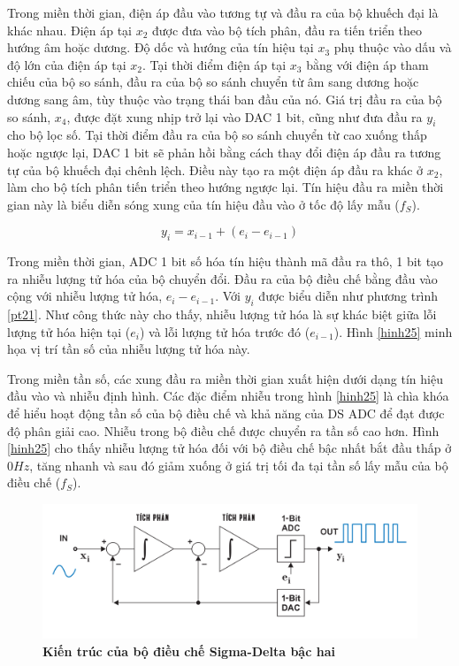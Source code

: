 Trong miền thời gian, điện áp đầu vào tương tự và đầu ra của bộ khuếch đại là khác nhau. Điện áp tại $x_2$ được đưa vào bộ tích phân, đầu ra tiến triển theo hướng âm hoặc dương. Độ dốc và hướng của tín hiệu tại $x_3$ phụ thuộc vào dấu và độ lớn của điện áp tại $x_2$. Tại thời điểm điện áp tại $x_3$ bằng với điện áp tham chiếu của bộ so sánh, đầu ra của bộ so sánh chuyển từ âm sang dương hoặc dương sang âm, tùy thuộc vào trạng thái ban đầu của nó. Giá trị đầu ra của bộ so sánh, $x_4$, được đặt xung nhịp trở lại vào DAC 1 bit, cũng như đưa đầu ra $y_i$ cho bộ lọc số. Tại thời điểm đầu ra của bộ so sánh chuyển từ cao xuống thấp hoặc ngược lại, DAC 1 bit sẽ phản hồi bằng cách thay đổi điện áp đầu ra tương tự của bộ khuếch đại chênh lệch. Điều này tạo ra một điện áp đầu ra khác ở $x_2$, làm cho bộ tích phân tiến triển theo hướng ngược lại. Tín hiệu đầu ra miền thời gian này là biểu diễn sóng xung của tín hiệu đầu vào ở tốc độ lấy mẫu ($f_S$).

\begin{equation}\label{pt21}
    y_i = x_{i - 1} + (e_i - e_{i - 1})
\end{equation}

 Trong miền thời gian, ADC 1 bit số hóa tín hiệu thành mã đầu ra thô, 1 bit tạo ra nhiễu lượng tử hóa của bộ chuyển đổi. Đầu ra của bộ điều chế bằng đầu vào cộng với nhiễu lượng tử hóa, $e_i - e_{i-1}$. Với $y_i$ được biểu diễn như phương trình \ref{pt21}. Như công thức này cho thấy, nhiễu lượng tử hóa là sự khác biệt giữa lỗi lượng tử hóa hiện tại ($e_i$) và lỗi lượng tử hóa trước đó ($e_{i - 1}$). Hình \ref{hinh25} minh họa vị trí tần số của nhiễu lượng tử hóa này.

Trong miền tần số, các xung đầu ra miền thời gian xuất hiện dưới dạng tín hiệu đầu vào và nhiễu định hình. Các đặc điểm nhiễu trong hình \ref{hinh25} là chìa khóa để hiểu hoạt động tần số của bộ điều chế và khả năng của DS ADC để đạt được độ phân giải cao. Nhiễu trong bộ điều chế được chuyển ra tần số cao hơn. Hình \ref{hinh25} cho thấy nhiễu lượng tử hóa đối với bộ điều chế bậc nhất bắt đầu thấp ở $0 Hz$, tăng nhanh và sau đó giảm xuống ở giá trị tối đa tại tần số lấy mẫu của bộ điều chế ($f_S$).

\begin{figure}[!ht]
    \centering
    \includegraphics[width=13cm]{Images/Chuong2/kientruc_2st.png}
    \caption[Kiến trúc của bộ điều chế Sigma-Delta bậc hai]{\bfseries \fontsize{12pt}{0pt}\selectfont Kiến trúc của bộ điều chế Sigma-Delta bậc hai}
    \label{hinh26}
\end{figure}

